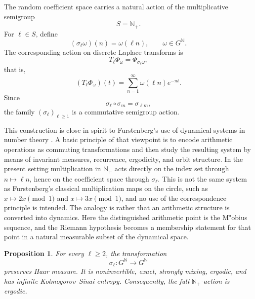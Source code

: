 \documentclass[11pt]{article}
\newtheorem{proposition}[theorem]{Proposition}
\theoremstyle{remark}
\begin{document}
The random coefficient space carries a natural action of the
multiplicative semigroup
\[
S=\mathbb N_{+}.
\]
For \(\ell\in S\), define
\[
(\sigma_\ell\omega)(n)=\omega(\ell n),
\qquad
\omega\in G^{\mathbb N}.
\]
The corresponding action on discrete Laplace transforms is
\[
T_\ell\Phi_\omega
=
\Phi_{\sigma_\ell\omega},
\]
that is,
\[
(T_\ell\Phi_\omega)(t)
=
\sum_{n=1}^{\infty}\omega(\ell n)e^{-nt}.
\]
Since
\[
\sigma_\ell\circ\sigma_m=\sigma_{\ell m},
\]
the family \((\sigma_\ell)_{\ell\geq1}\) is a commutative semigroup
action.

This construction is close in spirit to Furstenberg's use of dynamical
systems in number theory \cite{Furstenberg1967,Furstenberg1981}.  A basic
principle of that viewpoint is to encode arithmetic operations as
commuting transformations and then study the resulting system by means
of invariant measures, recurrence, ergodicity, and orbit structure.  In
the present setting multiplication in \(\mathbb N_+\) acts directly on
the index set through \(n\mapsto \ell n\), hence on the coefficient
space through \(\sigma_\ell\).  This is not the same system as
Furstenberg's classical multiplication maps on the circle, such as
\(x\mapsto 2x\pmod 1\) and \(x\mapsto 3x\pmod 1\), and no use of the
correspondence principle is intended.  The analogy is rather that an
arithmetic structure is converted into dynamics.  Here the distinguished
arithmetic point is the M"obius sequence, and the Riemann hypothesis
becomes a membership statement for that point in a natural measurable
subset of the dynamical space.

\begin{proposition}
\label{prop:semigroup-action}
For every \(\ell\geq2\), the transformation
\[
\sigma_\ell:G^{\mathbb N}\longrightarrow G^{\mathbb N}
\]
preserves Haar measure.  It is noninvertible, exact, strongly mixing,
ergodic, and has infinite Kolmogorov--Sinai entropy.  Consequently, the
full \(\mathbb N_{+}\)-action is ergodic.
\end{proposition}
\end{document}

